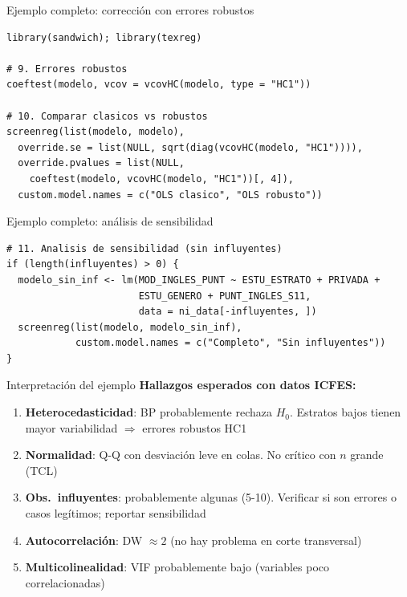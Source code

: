 \documentclass[aspectratio=169, 11pt]{beamer}
\begin{document}
\begin{frame}[fragile]{Ejemplo completo: corrección con errores robustos}
\small
\begin{lstlisting}
library(sandwich); library(texreg)

# 9. Errores robustos
coeftest(modelo, vcov = vcovHC(modelo, type = "HC1"))

# 10. Comparar clasicos vs robustos
screenreg(list(modelo, modelo),
  override.se = list(NULL, sqrt(diag(vcovHC(modelo, "HC1")))),
  override.pvalues = list(NULL,
    coeftest(modelo, vcovHC(modelo, "HC1"))[, 4]),
  custom.model.names = c("OLS clasico", "OLS robusto"))
\end{lstlisting}
\end{frame}

\begin{frame}[fragile]{Ejemplo completo: análisis de sensibilidad}
\small
\begin{lstlisting}
# 11. Analisis de sensibilidad (sin influyentes)
if (length(influyentes) > 0) {
  modelo_sin_inf <- lm(MOD_INGLES_PUNT ~ ESTU_ESTRATO + PRIVADA +
                       ESTU_GENERO + PUNT_INGLES_S11,
                       data = ni_data[-influyentes, ])
  screenreg(list(modelo, modelo_sin_inf),
            custom.model.names = c("Completo", "Sin influyentes"))
}
\end{lstlisting}
\end{frame}

\begin{frame}{Interpretación del ejemplo}
\textbf{Hallazgos esperados con datos ICFES:}
\begin{enumerate}
\item \textbf{Heterocedasticidad}: BP probablemente rechaza $H_0$. Estratos bajos tienen mayor variabilidad $\Rightarrow$ errores robustos HC1
\item \textbf{Normalidad}: Q-Q con desviación leve en colas. No crítico con $n$ grande (TCL)
\item \textbf{Obs.\ influyentes}: probablemente algunas (5-10). Verificar si son errores o casos legítimos; reportar sensibilidad
\item \textbf{Autocorrelación}: DW $\approx 2$ (no hay problema en corte transversal)
\item \textbf{Multicolinealidad}: VIF probablemente bajo (variables poco correlacionadas)
\end{enumerate}
\end{frame}

\end{document}
